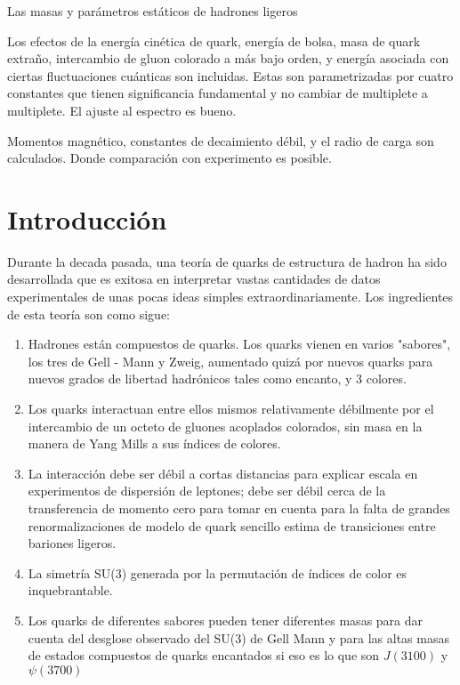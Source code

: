 Las masas y parámetros estáticos de hadrones ligeros 

Los efectos  de la energía cinética de quark, energía de bolsa, masa de quark extraño, intercambio de gluon colorado a más bajo orden, y energía asociada con ciertas fluctuaciones cuánticas son incluidas. Estas son parametrizadas por cuatro constantes que tienen significancia fundamental y no cambiar de multiplete a multiplete. El ajuste al espectro es bueno.

Momentos magnético, constantes de decaimiento débil, y el radio de carga son calculados. Donde comparación con experimento es posible.

\section{Introducción}

Durante la decada pasada, una teoría de quarks de estructura de hadron ha sido desarrollada que es exitosa en interpretar vastas cantidades de datos experimentales de unas pocas ideas simples extraordinariamente. Los ingredientes de esta teoría son como sigue:

\begin{enumerate}
\item Hadrones están compuestos de quarks. Los quarks vienen en varios "sabores", los tres de Gell - Mann y Zweig, aumentado quizá por nuevos quarks para nuevos grados de libertad hadrónicos tales como encanto, y 3 colores.
\item Los quarks interactuan entre ellos mismos relativamente débilmente por el intercambio de un octeto de gluones acoplados colorados, sin masa en la manera de Yang Mills a sus índices de colores. 
\item La interacción debe ser débil a cortas distancias para explicar escala en experimentos de dispersión de leptones; debe ser débil cerca de la transferencia de momento cero para tomar en cuenta para la falta de grandes renormalizaciones de modelo de quark sencillo estima de transiciones entre bariones ligeros.
\item La simetría SU(3) generada por la permutación de índices de color es inquebrantable.
\item Los quarks de diferentes sabores pueden tener diferentes masas para dar cuenta del desglose observado del SU(3) de Gell Mann y para las altas masas de estados compuestos de quarks encantados si eso es lo que son $J(3100)$ y $\psi(3700)$
\end{enumerate}

